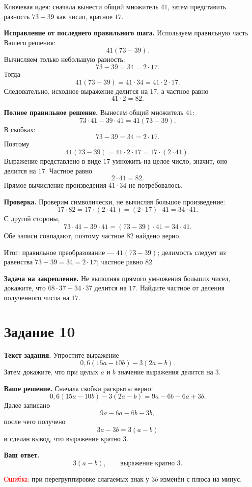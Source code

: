 \documentclass[12pt,a4paper]{article}
\begin{document}
\textcolor{blue!60!black}{Ключевая идея:} сначала вынести общий множитель $41$, затем представить разность $73-39$ как число, кратное $17$.

\textbf{Исправление от последнего правильного шага.}
Используем правильную часть Вашего решения:
\[
41(73-39).
\]
Вычисляем только небольшую разность:
\[
73-39=34=2\cdot17.
\]
Тогда
\[
41(73-39)=41\cdot34=41\cdot2\cdot17.
\]
Следовательно, исходное выражение делится на $17$, а частное равно
\[
41\cdot2=82.
\]

\textbf{Полное правильное решение.}
Вынесем общий множитель $41$:
\[
73\cdot41-39\cdot41=41(73-39).
\]
В скобках:
\[
73-39=34=2\cdot17.
\]
Поэтому
\[
41(73-39)=41\cdot2\cdot17=17\cdot(2\cdot41).
\]
Выражение представлено в виде $17$ умножить на целое число, значит, оно делится на $17$.
Частное равно
\[
2\cdot41=82.
\]
Прямое вычисление произведения $41\cdot34$ не потребовалось.

\textbf{Проверка.}
Проверим символически, не вычисляя большое произведение:
\[
17\cdot82=17\cdot(2\cdot41)=(2\cdot17)\cdot41=34\cdot41.
\]
С другой стороны,
\[
73\cdot41-39\cdot41=(73-39)\cdot41=34\cdot41.
\]
Обе записи совпадают, поэтому частное $82$ найдено верно.

\textcolor{teal!60!black}{Итог:} правильное преобразование --- $41(73-39)$; делимость следует из равенства $73-39=34=2\cdot17$; частное равно $82$.

\textbf{Задача на закрепление.}
Не выполняя прямого умножения больших чисел, докажите, что $68\cdot37-34\cdot37$ делится на $17$. Найдите частное от деления полученного числа на $17$.

\newpage
{}\label{task:10}
\section*{Задание 10}

\textbf{Текст задания.}
Упростите выражение
\[
0{,}6(15a-10b)-3(2a-b).
\]
Затем докажите, что при целых $a$ и $b$ значение выражения делится на $3$.

\textbf{Ваше решение.}
Сначала скобки раскрыты верно:
\[
0{,}6(15a-10b)-3(2a-b)=9a-6b-6a+3b.
\]
Далее записано
\[
9a-6a-6b-3b,
\]
после чего получено
\[
3a-3b=3(a-b)
\]
и сделан вывод, что выражение кратно $3$.

\textbf{Ваш ответ.}
\[
3(a-b), \qquad \text{выражение кратно }3.
\]

\textcolor{red}{Ошибка:} при перегруппировке слагаемых знак у $3b$ изменён с плюса на минус.
\end{document}
